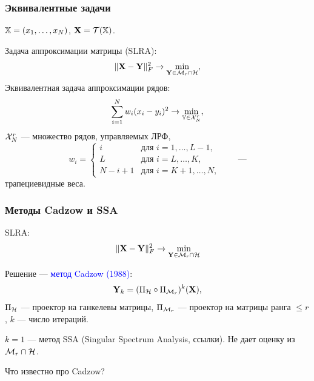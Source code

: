 \documentclass[unicode, notheorems]{beamer}
\begin{document}
\begin{frame}
	\frametitle{Эквивалентные задачи}
	\vspace{-0.2cm}
	$\mathbb{X} = (x_1, \ldots, x_N)$, $\mathbf{X} = \mathcal{T}(\mathbb{X})$. 
	
	Задача аппроксимации матрицы (SLRA):
	\begin{equation*} \label{matrixtask}
	\|\mathbf{X} - \mathbf{Y}\|^2_F \to \min_{\substack{\mathbf{Y} \in \mathcal{M}_r \cap \mathcal{H}}},
	\end{equation*}
	\vspace{0.2cm}
	Эквивалентная задача аппроксимации рядов:
	\begin{equation*}
	\sum \limits_{i=1}^N w_i(x_i - y_i)^2 \to \min_{\mathbb{Y} \in \mathcal{X}_N^r},
	\end{equation*}
	$\mathcal{X}_N^r$ --- множество рядов, управляемых ЛРФ,
	\begin{equation*}
	w_i = \begin{cases}
	i & \text{для $i = 1, \ldots, L-1,$}\\
	L & \text{для $i = L, \ldots, K,$}\\
	N - i + 1 & \text{для $i = K + 1, \ldots, N,$}
	\end{cases} \qquad \text{---}
	\end{equation*}
	трапециевидные веса.
\end{frame}

\begin{frame}
	\frametitle{Методы Cadzow и SSA}
	
	SLRA:
	\begin{equation*}
		\|\mathbf{X} - \mathbf{Y}\|^2_F \to \min_{\substack{\mathbf{Y} \in \mathcal{M}_r \cap \mathcal{H}}}
	\end{equation*}

	Решение --- \textcolor{blue}{метод Cadzow (1988)}: 
	\begin{equation*}
	\mathbf{Y}_k = (\Pi_{\mathcal{H}} \circ \Pi_{\mathcal{M}_r})^k (\mathbf{X}),
	\end{equation*}
	$\Pi_{\mathcal{H}}$ --- проектор на ганкелевы матрицы, $\Pi_{\mathcal{M}_r}$ --- проектор на матрицы ранга $\le r$, $k$ --- число итераций.
			

	$k = 1$ --- метод SSA (Singular Spectrum Analysis, ссылки). Не дает оценку из $\mathcal{M}_r \cap \mathcal{H}$.
	
	\vspace{0.4cm}\pause		
	Что известно про Cadzow?
\end{frame}
\end{document}
